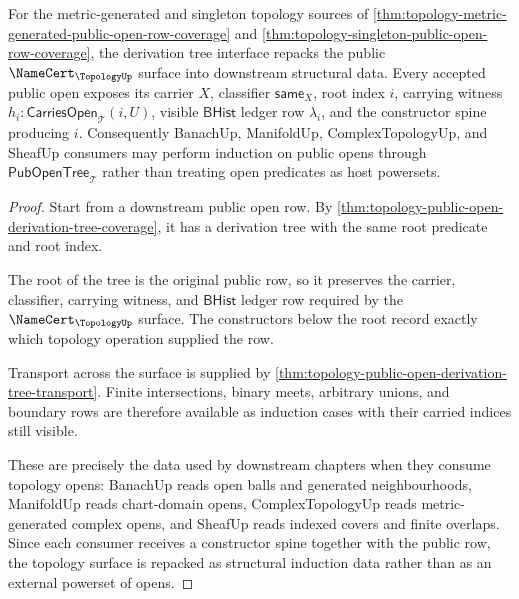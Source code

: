 \begin{theorem}
\label{thm:topology-public-open-derivation-tree-namecert-surface}
For the metric-generated and singleton topology sources of \autoref{thm:topology-metric-generated-public-open-row-coverage} and \autoref{thm:topology-singleton-public-open-row-coverage}, the derivation tree interface repacks the public $\NameCert_{\TopologyUp}$ surface into downstream structural data. Every accepted public open exposes its carrier $X$, classifier $\mathsf{same}_X$, root index $i$, carrying witness $h_i:\mathsf{CarriesOpen}_{\mathcal{T}}(i,U)$, visible $\mathsf{BHist}$ ledger row $\lambda_i$, and the constructor spine producing $i$. Consequently BanachUp, ManifoldUp, ComplexTopologyUp, and SheafUp consumers may perform induction on public opens through $\mathsf{PubOpenTree}_{\mathcal{T}}$ rather than treating open predicates as host powersets.
\end{theorem}
\begin{proof}
Start from a downstream public open row. By \autoref{thm:topology-public-open-derivation-tree-coverage}, it has a derivation tree with the same root predicate and root index.

The root of the tree is the original public row, so it preserves the carrier, classifier, carrying witness, and $\mathsf{BHist}$ ledger row required by the $\NameCert_{\TopologyUp}$ surface. The constructors below the root record exactly which topology operation supplied the row.

Transport across the surface is supplied by \autoref{thm:topology-public-open-derivation-tree-transport}. Finite intersections, binary meets, arbitrary unions, and boundary rows are therefore available as induction cases with their carried indices still visible.

These are precisely the data used by downstream chapters when they consume topology opens: BanachUp reads open balls and generated neighbourhoods, ManifoldUp reads chart-domain opens, ComplexTopologyUp reads metric-generated complex opens, and SheafUp reads indexed covers and finite overlaps. Since each consumer receives a constructor spine together with the public row, the topology surface is repacked as structural induction data rather than as an external powerset of opens.
\end{proof}
